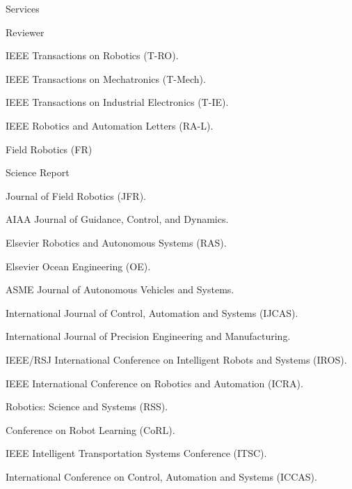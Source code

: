 \begin{rSection}{Services}
\newpage
\begin{rSubsection}{Reviewer}{}{}{}
  \item IEEE Transactions on Robotics (T-RO).
  \item IEEE Transactions on Mechatronics (T-Mech).
  \item IEEE Transactions on Industrial Electronics (T-IE).
  \item IEEE Robotics and Automation Letters (RA-L).
  \item Field Robotics (FR)
  \item Science Report
  \item Journal of Field Robotics (JFR).
  \item AIAA Journal of Guidance, Control, and Dynamics.
  \item Elsevier Robotics and Autonomous Systems (RAS).
  \item Elsevier Ocean Engineering (OE).
  \item ASME Journal of Autonomous Vehicles and Systems.
  \item International Journal of Control, Automation and Systems (IJCAS).
  \item International Journal of Precision Engineering and Manufacturing.
  \item IEEE/RSJ International Conference on Intelligent Robots and Systems (IROS).
  \item IEEE International Conference on Robotics and Automation (ICRA).
  \item Robotics: Science and Systems (RSS).
  \item Conference on Robot Learning (CoRL).
  \item IEEE Intelligent Transportation Systems Conference (ITSC).
  \item International Conference on Control, Automation and Systems (ICCAS).
\end{rSubsection}


\end{rSection}
